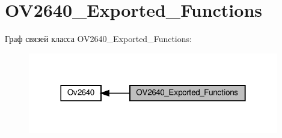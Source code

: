 \hypertarget{group___o_v2640___exported___functions}{}\section{O\+V2640\+\_\+\+Exported\+\_\+\+Functions}
\label{group___o_v2640___exported___functions}
Граф связей класса O\+V2640\+\_\+\+Exported\+\_\+\+Functions\+:
\nopagebreak
\begin{figure}[H]
\begin{center}
\leavevmode
\includegraphics[width=310pt]{group___o_v2640___exported___functions}
\end{center}
\end{figure}
